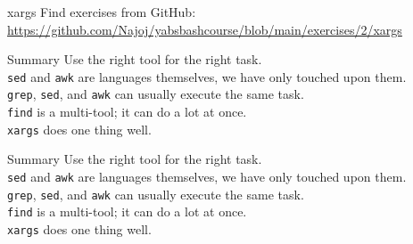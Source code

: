\documentclass{beamer}
\let\tt\texttt
\begin{document}
\begin{frame}{xargs}
        Find exercises from GitHub: \\
        \url{https://github.com/Najoj/yabsbashcourse/blob/main/exercises/2/xargs}
\end{frame}

\begin{frame}{Summary}
        Use the right tool for the right task. \\
        \tt{sed} and \tt{awk} are languages themselves, we have only touched upon them. \\
        \tt{grep}, \tt{sed}, and \tt{awk} can usually execute the same task. \\
        \tt{find} is a multi-tool; it can do a lot at once. \\
        \tt{xargs} does one thing well.
\end{frame}
\begin{frame}{Summary}
        Use the right tool for the right task. \\
        \tt{sed} and \tt{awk} are languages themselves, we have only touched upon them. \\
        \tt{grep}, \tt{sed}, and \tt{awk} can usually execute the same task. \\
        \tt{find} is a multi-tool; it can do a lot at once. \\
        \tt{xargs} does one thing well.
\end{frame}
\end{document}
